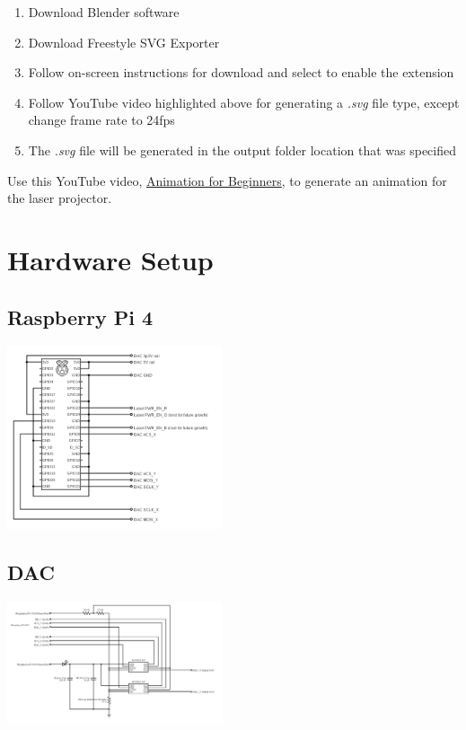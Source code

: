\documentclass[journal]{IEEEtran}
\begin{document}
    \begin{enumerate}
        \item Download Blender software
        \item Download Freestyle SVG Exporter
        \item Follow on-screen instructions for download and select to enable the extension
        \item Follow YouTube video highlighted above for generating a \emph{.svg} file type, except change frame rate to 24fps
        \item The \emph{.svg} file will be generated in the output folder location that was specified 
    \end{enumerate}

    Use this YouTube video, {\href{https://youtu.be/CBJp82tlR3M?si=AnMmnkilE5h2m_C9}{Animation for Beginners}}, to generate an animation for the laser projector.

    \section{Hardware Setup}
    \subsection{Raspberry Pi 4}

    \includegraphics[width=2.5in]{../artifacts/docs/circuit_diagrams/rpi4_circuit.png}

    \subsection{DAC}

    \includegraphics[width=2.5in]{../artifacts/docs/circuit_diagrams/dac_circuit.png}
\end{document}
